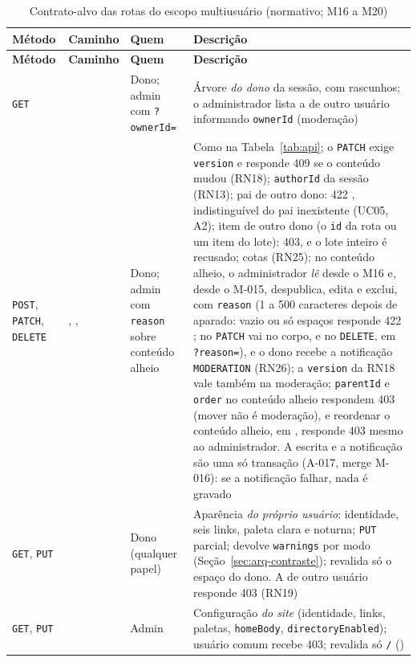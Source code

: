 \begin{longtable}{@{}L{1.5cm}L{4.1cm}L{2.1cm}L{6.1cm}@{}}
\caption{Contrato-alvo das rotas do escopo multiusuário (normativo; M16 a M20)}\label{tab:api-alvo}\\
\toprule
\textbf{Método} & \textbf{Caminho} & \textbf{Quem} & \textbf{Descrição}\\
\midrule
\endfirsthead
\toprule
\textbf{Método} & \textbf{Caminho} & \textbf{Quem} & \textbf{Descrição}\\
\midrule
\endhead
\bottomrule
\endfoot
\texttt{GET} &  & Dono; admin com \texttt{?ownerId=} & Árvore \emph{do dono} da sessão, com rascunhos; o administrador lista a de outro usuário informando \texttt{ownerId} (moderação)\\[1pt]
\texttt{POST}, \texttt{PATCH}, \texttt{DELETE} & , ,  & Dono; admin com \texttt{reason} sobre conteúdo alheio & Como na Tabela~\ref{tab:api}; o \texttt{PATCH} exige \texttt{version} e responde 409  se o conteúdo mudou (RN18); \texttt{authorId} da sessão (RN13); pai de outro dono: 422 , indistinguível do pai inexistente (UC05, A2); item de outro dono (o \texttt{id} da rota ou um item do lote): 403, e o lote inteiro é recusado; cotas (RN25); no conteúdo alheio, o administrador \emph{lê} desde o M16 e, desde o M-015, despublica, edita e exclui, com \texttt{reason} (1 a 500 caracteres depois de aparado: vazio ou só espaços responde 422 ; no \texttt{PATCH} vai no corpo, e no \texttt{DELETE}, em \texttt{?reason=}), e o dono recebe a notificação \texttt{MODERATION} (RN26); a \texttt{version} da RN18 vale também na moderação; \texttt{parentId} e \texttt{order} no conteúdo alheio respondem 403 (mover não é moderação), e reordenar o conteúdo alheio, em , responde 403 mesmo ao administrador. A escrita e a notificação são uma só transação (A-017, merge M-016): se a notificação falhar, nada é gravado\\[1pt]
\texttt{GET}, \texttt{PUT} &  & Dono (qualquer papel) & Aparência \emph{do próprio usuário}: identidade, seis links, paleta clara e noturna; \texttt{PUT} parcial; devolve \texttt{warnings} por modo (Seção~\ref{sec:arq-contraste}); revalida só o espaço do dono. A de outro usuário responde 403 (RN19)\\[1pt]
\texttt{GET}, \texttt{PUT} &  & Admin & Configuração \emph{do site} (identidade, links, paletas, \texttt{homeBody}, \texttt{directoryEnabled}); usuário comum recebe 403; revalida só \texttt{/} ()\\[1pt]

\end{longtable}
